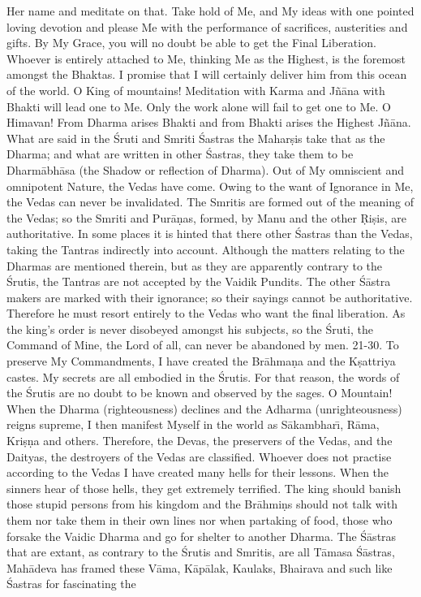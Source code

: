 Her name and meditate on that. Take hold of Me, and My ideas with one pointed loving devotion and please Me with the performance of sacrifices, austerities and gifts. By My Grace, you will no doubt be able to get the Final Liberation. Whoever is entirely attached to Me, thinking Me as the Highest, is the foremost amongst the Bhaktas. I promise that I will certainly deliver him from this ocean of the world. O King of mountains! Meditation with Karma and J\~n\=ana with Bhakti will lead one to Me. Only the work alone will fail to get one to Me. O Himavan! From Dharma arises Bhakti and from Bhakti arises the Highest J\~n\=ana. What are said in the \'Sruti and Smriti \'Sastras the Mahar\d{s}is take that as the Dharma; and what are written in other \'Sastras, they take them to be Dharm\=abh\=asa (the Shadow or reflection of Dharma). Out of My omniscient and omnipotent Nature, the Vedas have come. Owing to the want of Ignorance in Me, the Vedas can never be invalidated. The Smritis are formed out of the meaning of the Vedas; so the Smriti and Pur\=a\d{n}as, formed, by Manu and the other \d{R}i\d{s}is, are authoritative. In some places it is hinted that there other \'Sastras than the Vedas, taking the Tantras indirectly into account. Although the matters relating to the Dharmas are mentioned therein, but as they are apparently contrary to the \'Srutis, the Tantras are not accepted by the Vaidik Pundits. The other \'S\=astra makers are marked with their ignorance; so their sayings cannot be authoritative. Therefore he must resort entirely to the Vedas who want the final liberation. As the king's order is never disobeyed amongst his subjects, so the \'Sruti, the Command of Mine, the Lord of all, can never be abandoned by men.
21-30. To preserve My Commandments, I have created the Br\=ahma\d{n}a and the K\d{s}attriya castes. My secrets are all embodied in the \'Srutis. For that reason, the words of the \'Srutis are no doubt to be known and observed by the sages. O Mountain! When the Dharma (righteousness) declines and the Adharma (unrighteousness) reigns supreme, I then manifest Myself in the world as S\=akambhar\={\i}, R\=ama, Kri\d{s}\d{n}a and others. Therefore, the Devas, the preservers of the Vedas, and the Daityas, the destroyers of the Vedas are classified. Whoever does not practise according to the Vedas I have created many hells for their lessons. When the sinners hear of those hells, they get extremely terrified. The king should banish those stupid persons from his kingdom and the Br\=ahmi\d{n}s should not talk with them nor take them in their own lines nor when partaking of food, those who forsake the Vaidic Dharma and go for shelter to another Dharma. The \'S\=astras that are extant, as contrary to the \'Srutis and Smritis, are all T\=amasa \'S\=astras, Mah\=adeva has framed these V\=ama, K\=ap\=alak, Kaulaks, Bhairava and such like \'Sastras for fascinating the

